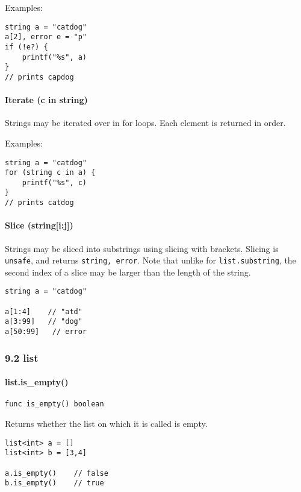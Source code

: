 \documentclass[]{article}
\begin{document}
Examples:

\begin{verbatim}
string a = "catdog"
a[2], error e = "p"
if (!e?) {
    printf("%s", a)
}
// prints capdog
\end{verbatim}

\paragraph{Iterate (c in string)}\label{iterate-c-in-string}

Strings may be iterated over in for loops. Each element is returned in
order.

Examples:

\begin{verbatim}
string a = "catdog"
for (string c in a) {
    printf("%s", c)
}
// prints catdog
\end{verbatim}

\paragraph{Slice (string{[}i:j{]})}\label{slice-stringij}

Strings may be sliced into substrings using slicing with brackets.
Slicing is \texttt{unsafe}, and returns \texttt{string, error}. Note
that unlike for \texttt{list.substring}, the second index of a slice may
be larger than the length of the string.

\begin{verbatim}
string a = "catdog"

a[1:4]    // "atd"
a[3:99]   // "dog"
a[50:99]   // error
\end{verbatim}

\subsubsection{9.2 list}\label{list-1}

\paragraph{list.is\_empty()}\label{list.isux5fempty}

\begin{verbatim}
func is_empty() boolean
\end{verbatim}

Returns whether the list on which it is called is empty.

\begin{verbatim}
list<int> a = []
list<int> b = [3,4]

a.is_empty()    // false
b.is_empty()    // true
\end{verbatim}
\end{document}
